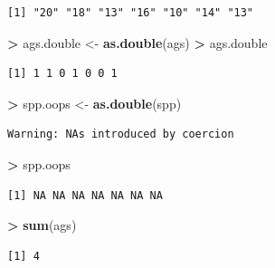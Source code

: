 \documentclass[]{krantz}
\makeatletter
\newenvironment{Shaded}{\begin{snugshade}}{\end{snugshade}}
\newcommand{\KeywordTok}[1]{\textcolor[rgb]{0.27,0.27,0.27}{\textbf{#1}}}
\newcommand{\StringTok}[1]{\textcolor[rgb]{0.5,0.5,0.5}{#1}}
\newcommand{\OperatorTok}[1]{\textcolor[rgb]{0.43,0.43,0.43}{\textbf{#1}}}
\newcommand{\NormalTok}[1]{#1}
\newenvironment{kframe}{%
\medskip{}
\setlength{\fboxsep}{.8em}
 \def\at@end@of@kframe{}%
 \ifinner\ifhmode%
  \def\at@end@of@kframe{\end{minipage}}%
  \begin{minipage}{\columnwidth}%
 \fi\fi%
 \def\FrameCommand##1{\hskip\@totalleftmargin \hskip-\fboxsep
 \colorbox{shadecolor}{##1}\hskip-\fboxsep
     \hskip-\linewidth \hskip-\@totalleftmargin \hskip\columnwidth}%
 \MakeFramed {\advance\hsize-\width
   \@totalleftmargin\z@ \linewidth\hsize
   \@setminipage}}%
 {\par\unskip\endMakeFramed%
 \at@end@of@kframe}
\renewenvironment{Shaded}{\begin{kframe}}{\end{kframe}}
\theoremstyle{definition}
\theoremstyle{definition}
\theoremstyle{definition}
\theoremstyle{remark}
\makeatother
\begin{document}
\begin{verbatim}
[1] "20" "18" "13" "16" "10" "14" "13"
\end{verbatim}

\begin{Shaded}
\begin{Highlighting}[]
\OperatorTok{>}\StringTok{ }\NormalTok{ags.double <-}\StringTok{ }\KeywordTok{as.double}\NormalTok{(ags)}
\OperatorTok{>}\StringTok{ }\NormalTok{ags.double}
\end{Highlighting}
\end{Shaded}

\begin{verbatim}
[1] 1 1 0 1 0 0 1
\end{verbatim}

\begin{Shaded}
\begin{Highlighting}[]
\OperatorTok{>}\StringTok{ }\NormalTok{spp.oops <-}\StringTok{ }\KeywordTok{as.double}\NormalTok{(spp)}
\end{Highlighting}
\end{Shaded}

\begin{verbatim}
Warning: NAs introduced by coercion
\end{verbatim}

\begin{Shaded}
\begin{Highlighting}[]
\OperatorTok{>}\StringTok{ }\NormalTok{spp.oops}
\end{Highlighting}
\end{Shaded}

\begin{verbatim}
[1] NA NA NA NA NA NA NA
\end{verbatim}

\begin{Shaded}
\begin{Highlighting}[]
\OperatorTok{>}\StringTok{ }\KeywordTok{sum}\NormalTok{(ags)}
\end{Highlighting}
\end{Shaded}

\begin{verbatim}
[1] 4
\end{verbatim}
\end{document}
